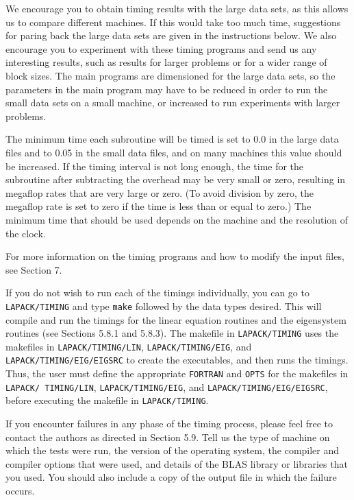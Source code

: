 We encourage you to obtain timing results with the large data sets,
as this allows us to compare different machines.
If this would take too much time, suggestions for paring back the large
data sets are given in the instructions below.
We also encourage you to experiment with these timing
programs and send us any interesting results, such as results for
larger problems or for a wider range of block sizes.
The main programs are dimensioned for the large data sets,
so the parameters in the main program may have to be reduced in order
to run the small data sets on a small machine, or increased to run
experiments with larger problems.

The minimum time each subroutine will be timed is set to 0.0 in
the large data files and to 0.05 in the small data files, and on
many machines this value should be increased.
If the timing interval is not long
enough, the time for the subroutine after subtracting the overhead
may be very small or zero, resulting in megaflop rates that are
very large or zero. (To avoid division by zero, the megaflop rate is
set to zero if the time is less than or equal to zero.)
The minimum time that should be used depends on the machine and the
resolution of the clock.

For more information on the timing programs and how to modify the
input files, see Section 7.

If you do not wish to run each of the timings individually, you can
go to {\tt LAPACK/TIMING} and
type {\tt make} followed by the data types desired.  This will compile
and run the timings for the linear equation routines and the eigensystem
routines (see Sections 5.8.1 and 5.8.3). 
The makefile in {\tt LAPACK/TIMING} uses the makefiles in
{\tt LAPACK/TIMING/LIN}, {\tt LAPACK/TIMING/EIG}, and
{\tt LAPACK/TIMING/EIG/EIGSRC} to create the executables, and then runs
the timings.  Thus,
the user must define the appropriate {\tt FORTRAN} and {\tt OPTS} for the
makefiles in {\tt LAPACK/ TIMING/LIN}, {\tt LAPACK/TIMING/EIG},
and {\tt LAPACK/TIMING/EIG/EIGSRC}, before executing the makefile
in {\tt LAPACK/TIMING}.

If you encounter failures in any phase of the timing process, please
feel free to contact the authors as directed in Section 5.9.  Tell us the 
type of machine on which the tests were run, the version of the operating
system, the compiler and compiler options that were used,
and details of the BLAS library or libraries that you used.  You should
also include a copy of the output file in which the failure occurs.


